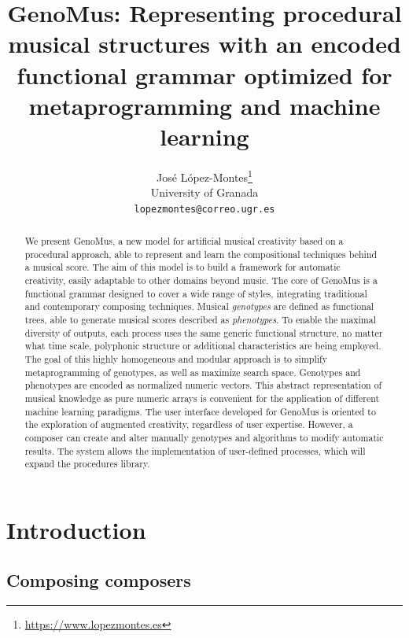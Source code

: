 \documentclass{article}
\title{GenoMus: Representing procedural musical structures with an encoded functional grammar optimized for metaprogramming and machine learning}
\author{
  Jos\'e L\'opez-Montes\thanks{\url{https://www.lopezmontes.es}} \\
  University of Granada\\
  \texttt{lopezmontes@correo.ugr.es} \\
}
\begin{document}
\maketitle

\begin{abstract}

 	
We present GenoMus, a new model for artificial musical creativity based on a procedural approach, able to represent and learn the compositional techniques behind a musical score. The aim of this model is to build a framework for automatic creativity, easily adaptable to other domains beyond music. The core of GenoMus is a functional grammar designed to cover a wide range of styles, integrating traditional and contemporary composing techniques. Musical \emph{genotypes} are defined as functional trees, able to generate musical scores described as \emph{phenotypes}. To enable the maximal diversity of outputs, each process uses the same generic functional structure, no matter what time scale, polyphonic structure or additional characteristics are being employed. The goal of this highly homogeneous and modular approach is to simplify metaprogramming of genotypes, as well as maximize search space. Genotypes and phenotypes are encoded as normalized numeric vectors. This abstract representation of musical knowledge as pure numeric arrays is convenient for the application of different machine learning paradigms. The user interface developed for GenoMus is oriented to the exploration of augmented creativity, regardless of user expertise. However, a composer can create and alter manually genotypes and algorithms to modify automatic results. The system allows the implementation of user-defined processes, which will expand the procedures library. 

\end{abstract}




\setcounter{tocdepth}{2}
\tableofcontents
\bigskip

\section{Introduction}
\subsection{Composing composers}
\end{document}
